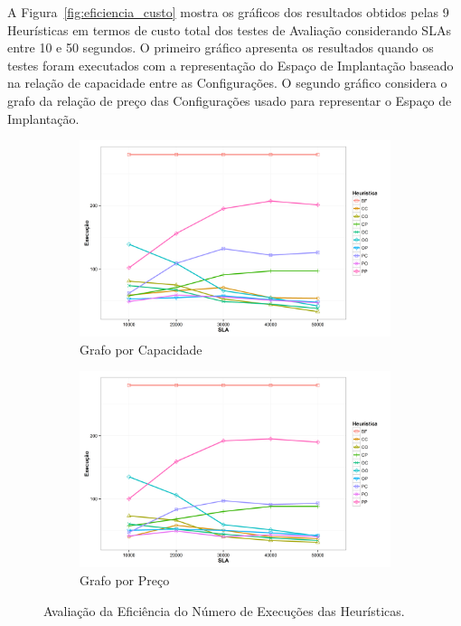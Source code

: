A Figura~\ref{fig:eficiencia_custo} mostra os gráficos dos resultados obtidos pelas
9 Heurísticas em termos de custo total dos testes de Avaliação considerando SLAs 
entre 10 e 50 segundos. O primeiro gráfico apresenta os resultados quando os testes
foram executados com a representação do Espaço de Implantação baseado na relação de
capacidade entre as Configurações. O segundo gráfico considera o grafo da relação
de preço das Configurações usado para representar o Espaço de Implantação.

\begin{figure}[t]
  \centering
    \begin{subfigure}[a]{0.7\textwidth}
      \includegraphics[width=\textwidth]{img/ExecutionCount-Capacity}
      \caption{Grafo por Capacidade}
      \label{fig:eficiencia_execucoes_capacidade}
    \end{subfigure}
    \begin{subfigure}[b]{0.7\textwidth}
      \includegraphics[width=\textwidth]{img/ExecutionCount-Price}
      \caption{Grafo por Preço}
      \label{fig:eficiencia_execucoes_preco}
    \end{subfigure}
  \caption{\label{fig:eficiencia_execucoes}Avaliação da Eficiência do Número de Execuções das Heurísticas.}
\end{figure}

